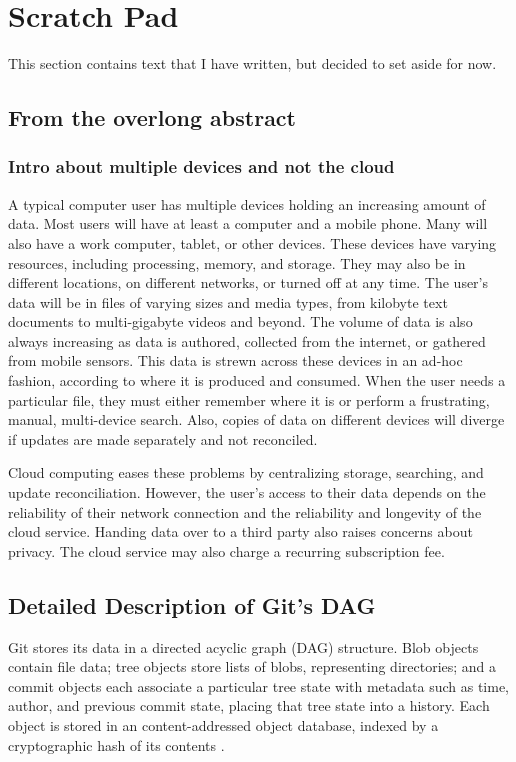 \section*{Scratch Pad}

This section contains text that I have written, but decided to set aside for now.

\subsection{From the overlong abstract}

\subsubsection{Intro about multiple devices and not the cloud}

A typical computer user has multiple devices holding an increasing amount of data.
Most users will have at least a computer and a mobile phone.
Many will also have a work computer, tablet, or other devices.
These devices have varying resources, including processing, memory, and storage.
They may also be in different locations, on different networks, or turned off at any time.
The user's data will be in files of varying sizes and media types, from kilobyte text documents to multi-gigabyte videos and beyond.
The volume of data is also always increasing as data is authored, collected from the internet, or gathered from mobile sensors.
This data is strewn across these devices in an ad-hoc fashion, according to where it is produced and consumed.
When the user needs a particular file, they must either remember where it is or perform a frustrating, manual, multi-device search.
Also, copies of data on different devices will diverge if updates are made separately and not reconciled.

Cloud computing eases these problems by centralizing storage, searching, and update reconciliation.
However, the user's access to their data depends on the reliability of their network connection and the reliability and longevity of the cloud service.
Handing data over to a third party also raises concerns about privacy.
The cloud service may also charge a recurring subscription fee.


\subsection{Detailed Description of Git's DAG}

Git stores its data in a directed acyclic graph (DAG) structure.
Blob objects contain file data;
tree objects store lists of blobs, representing directories;
and a commit objects each associate a particular tree state with metadata such as time, author, and previous commit state, placing that tree state into a history.
Each object is stored in an content-addressed object database, indexed by a cryptographic hash of its contents \cite{git_initial_readme}.

